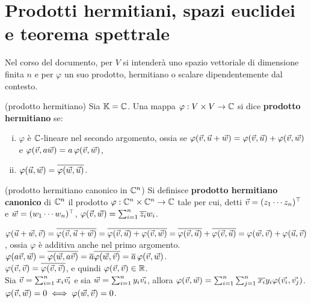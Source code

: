 \chapter{Prodotti hermitiani, spazi euclidei e teorema spettrale}

\begin{note}
	Nel corso del documento, per $V$ si intenderà uno spazio vettoriale di dimensione
	finita $n$ e per $\varphi$ un suo prodotto, hermitiano o scalare
	dipendentemente dal contesto.
\end{note}

\begin{definition} (prodotto hermitiano) Sia $\mathbb{K} = \mathbb C$. Una mappa $\varphi : V \times V \to \mathbb C$ si dice \textbf{prodotto hermitiano} se:
	
	\begin{enumerate}[(i)]
		\item $\varphi$ è $\mathbb C$-lineare nel secondo argomento, ossia se $\varphi(\v, \U + \w) = \varphi(\v, \U) + \varphi(\v, \w)$ e
		$\varphi(\v, a \w) = a \, \varphi(\v, \w)$,
		\item $\varphi(\U, \w) = \conj{\varphi(\w, \U)}$.
	\end{enumerate}
\end{definition}

\begin{definition} (prodotto hermitiano canonico in $\mathbb C^n$) Si definisce
	\textbf{prodotto hermitiano canonico} di $\mathbb C^n$ il prodotto $\varphi : \mathbb C^n \times \mathbb C^n \to \mathbb C$ tale per cui, detti $\v = (z_1 \cdots z_n)^\top$ e $\w = (w_1 \cdots w_n)^\top$, $\varphi(\v, \w) = \sum_{i=1}^n \conj{z_i} w_i$.
\end{definition}

\begin{remark}\nl
	\li $\varphi(\U + \w, \v) = \conj{\varphi(\v, \U + \w)} =
	\conj{\varphi(\v, \U) + \varphi(\v, \w)} = \conj{\varphi(\v, \U)} + \conj{\varphi(\v, \U)} = \varphi(\w, \v) + \varphi(\U, \v)$, ossia
	$\varphi$ è additiva anche nel primo argomento. \\
	\li $\varphi(a \v, \w) = \conj{\varphi(\w, a \v)} = \conj{a} \conj{\varphi(\w, \v)} = \conj{a} \, \varphi(\v, \w)$. \\
	\li $\varphi(\v, \v) = \conj{\varphi(\v, \v)}$, e quindi $\varphi(\v, \v) \in \RR$. \\
	\li Sia $\v = \sum_{i=1}^n x_i \vv i$ e sia $\w = \sum_{i=1}^n y_i \vv i$, allora $\varphi(\v, \w) = \sum_{i =1}^n \sum_{j=1}^n \conj{x_i} y_i \varphi(\vv i, \vv j)$. \\
	\li $\varphi(\v, \w) = 0 \iff \varphi(\w, \v) = 0$.
\end{remark}

